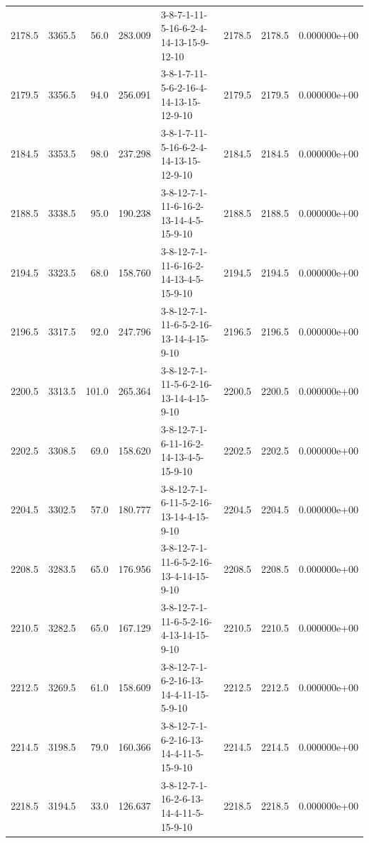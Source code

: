 \begin{tabular}{rrrrlrrr}
 2178.5 &  3365.5 &           56.0 &            283.009 &  3-8-7-1-11-5-16-6-2-4-14-13-15-9-12-10 &        2178.5 &          2178.5 &  0.000000e+00 \\
 2179.5 &  3356.5 &           94.0 &            256.091 &  3-8-1-7-11-5-6-2-16-4-14-13-15-12-9-10 &        2179.5 &          2179.5 &  0.000000e+00 \\
 2184.5 &  3353.5 &           98.0 &            237.298 &  3-8-1-7-11-5-16-6-2-4-14-13-15-12-9-10 &        2184.5 &          2184.5 &  0.000000e+00 \\
 2188.5 &  3338.5 &           95.0 &            190.238 &  3-8-12-7-1-11-6-16-2-13-14-4-5-15-9-10 &        2188.5 &          2188.5 &  0.000000e+00 \\
 2194.5 &  3323.5 &           68.0 &            158.760 &  3-8-12-7-1-11-6-16-2-14-13-4-5-15-9-10 &        2194.5 &          2194.5 &  0.000000e+00 \\
 2196.5 &  3317.5 &           92.0 &            247.796 &  3-8-12-7-1-11-6-5-2-16-13-14-4-15-9-10 &        2196.5 &          2196.5 &  0.000000e+00 \\
 2200.5 &  3313.5 &          101.0 &            265.364 &  3-8-12-7-1-11-5-6-2-16-13-14-4-15-9-10 &        2200.5 &          2200.5 &  0.000000e+00 \\
 2202.5 &  3308.5 &           69.0 &            158.620 &  3-8-12-7-1-6-11-16-2-14-13-4-5-15-9-10 &        2202.5 &          2202.5 &  0.000000e+00 \\
 2204.5 &  3302.5 &           57.0 &            180.777 &  3-8-12-7-1-6-11-5-2-16-13-14-4-15-9-10 &        2204.5 &          2204.5 &  0.000000e+00 \\
 2208.5 &  3283.5 &           65.0 &            176.956 &  3-8-12-7-1-11-6-5-2-16-13-4-14-15-9-10 &        2208.5 &          2208.5 &  0.000000e+00 \\
 2210.5 &  3282.5 &           65.0 &            167.129 &  3-8-12-7-1-11-6-5-2-16-4-13-14-15-9-10 &        2210.5 &          2210.5 &  0.000000e+00 \\
 2212.5 &  3269.5 &           61.0 &            158.609 &  3-8-12-7-1-6-2-16-13-14-4-11-15-5-9-10 &        2212.5 &          2212.5 &  0.000000e+00 \\
 2214.5 &  3198.5 &           79.0 &            160.366 &  3-8-12-7-1-6-2-16-13-14-4-11-5-15-9-10 &        2214.5 &          2214.5 &  0.000000e+00 \\
 2218.5 &  3194.5 &           33.0 &            126.637 &  3-8-12-7-1-16-2-6-13-14-4-11-5-15-9-10 &        2218.5 &          2218.5 &  0.000000e+00 \\

\end{tabular}
